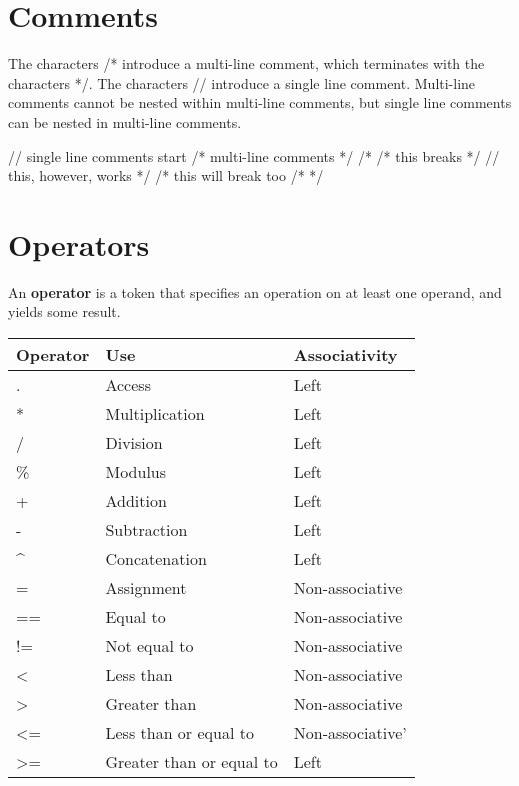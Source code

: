 \documentclass[oneside]{book}
\begin{document}
\section{Comments}
The characters /* introduce a multi-line comment, which terminates with the characters */. The characters // introduce a single line comment. Multi-line comments cannot be nested within multi-line comments, but single line comments can be nested in multi-line comments.\\
\begin{mdframed}
[hidealllines=true,backgroundcolor=gray!10,skipbelow=.5em,skipabove=.5em]
\begin{code}
// single line comments start 
/*
  multi-line comments
*/
/*
  /* this breaks */
  // this, however, works
*/
/* this will break too /* */
\end{code}
\end{mdframed}

\section{Operators}
An \textbf{operator} is a token that specifies an operation on at least one operand, and yields some result.
\begin{center}
  \begin{tabular}{| l | l| l|}
    \hline
    \textbf{Operator} & \textbf{Use} & \textbf{Associativity}\\ \hline
    . & Access & Left \\ \hline
    * & Multiplication & Left \\ \hline
    / & Division & Left \\ \hline
    \% & Modulus & Left \\ \hline
    + & Addition & Left \\ \hline
    - & Subtraction & Left \\ \hline
    \textasciicircum  & Concatenation & Left \\ \hline
    = & Assignment  & Non-associative\\ \hline
    == & Equal to  & Non-associative\\ \hline
    != & Not equal to  & Non-associative \\ \hline
    \textless & Less than  & Non-associative \\ \hline
    \textgreater & Greater than  & Non-associative \\ \hline
    \textless= & Less than or equal to  & Non-associative' \\ \hline
    \textgreater= & Greater than or equal to  & Left \\ \hline
  \end{tabular}
  
  
\end{center}
\end{document}
